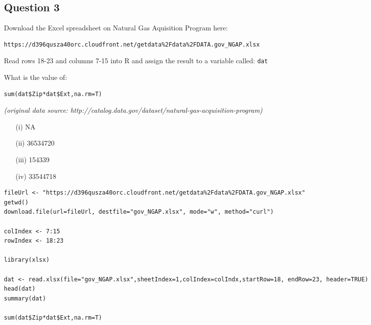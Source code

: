 \documentclass[]{article}
\begin{document}
\newpage
\subsection*{Question 3}

Download the Excel spreadsheet on Natural Gas Aquisition Program here: 

\begin{verbatim}
https://d396qusza40orc.cloudfront.net/getdata%2Fdata%2FDATA.gov_NGAP.xlsx 
\end{verbatim}

Read rows 18-23 and columns 7-15 into R and assign the result to a variable called:  \texttt{dat}  
\bigskip

What is the value of:  
\begin{framed}
\begin{verbatim}
sum(dat$Zip*dat$Ext,na.rm=T)  
\end{verbatim}
\end{framed}


\noindent \textit{(original data source: http://catalog.data.gov/dataset/natural-gas-acquisition-program)}

\begin{itemize} 
\item[(i)] NA 

\item[(ii)] 36534720 

\item[(iii)]  154339 

\item[(iv)] 33544718 
\end{itemize} 
\newpage
\begin{framed}
\begin{verbatim}
fileUrl <- "https://d396qusza40orc.cloudfront.net/getdata%2Fdata%2FDATA.gov_NGAP.xlsx"
getwd()
download.file(url=fileUrl, destfile="gov_NGAP.xlsx", mode="w", method="curl")

colIndex <- 7:15
rowIndex <- 18:23

library(xlsx)

dat <- read.xlsx(file="gov_NGAP.xlsx",sheetIndex=1,colIndex=colIndx,startRow=18, endRow=23, header=TRUE)
head(dat)
summary(dat)

sum(dat$Zip*dat$Ext,na.rm=T) 

\end{verbatim}
\end{framed}
\end{document}
